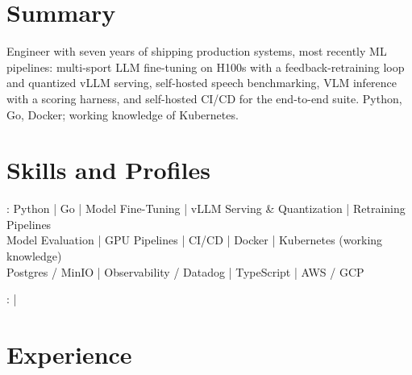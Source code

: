 \documentclass[print]{jack-resume}
\begin{document}
\pagecolor{darkmodeBackground}


\begin{minipage}[t][1cm][t]{.03\textwidth}
    \hfill
\end{minipage}

\section{Summary}
Engineer with seven years of shipping production systems, most recently ML pipelines: multi-sport LLM fine-tuning on H100s with a feedback-retraining loop and quantized vLLM serving, self-hosted speech benchmarking, VLM inference with a scoring harness, and self-hosted CI/CD for the end-to-end suite. Python, Go, Docker; working knowledge of Kubernetes.
\sectionsep

\section{Skills and Profiles}
:
Python \hfill | \hfill
Go \hfill | \hfill
Model Fine-Tuning \hfill | \hfill
vLLM Serving \& Quantization \hfill | \hfill
Retraining Pipelines \\
\hspace{1.0cm} Model Evaluation \hfill | \hfill
GPU Pipelines \hfill | \hfill
CI/CD \hfill | \hfill
Docker \hfill | \hfill
Kubernetes (working knowledge) \\
\hspace{1.0cm} Postgres / MinIO \hfill | \hfill
Observability / Datadog \hfill | \hfill
TypeScript \hfill | \hfill
AWS / GCP \\

\raggedright{
    :
      \href{https://www.linkedin.com/in/jack-sturtevant/}{ \ExternalLink} |
     \href{https://github.com/jacksturt}{ \ExternalLink}}

\section{Experience}
\end{document}
